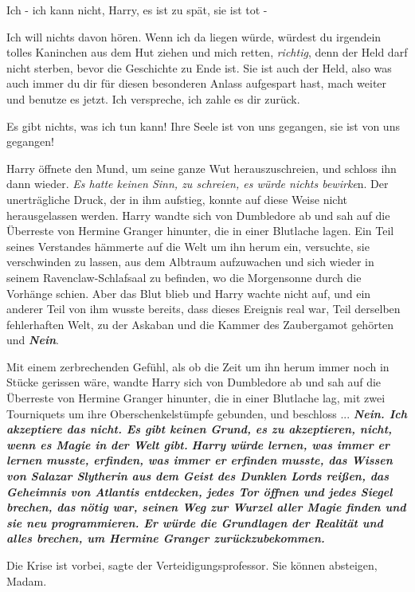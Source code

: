 \glqq{}Ich - ich kann nicht, Harry, es ist zu spät, sie ist tot -\grqq{}

\glqq{}Ich will nichts davon hören. Wenn ich da liegen würde, würdest du
irgendein tolles Kaninchen aus dem Hut ziehen und mich retten, \emph{richtig},
denn der Held darf nicht sterben, bevor die Geschichte zu Ende ist. Sie ist auch
der Held, also was auch immer du dir für diesen besonderen Anlass aufgespart
hast, mach weiter und benutze es jetzt. Ich verspreche, ich zahle es dir
zurück.\grqq{}

\glqq{}Es gibt nichts, was ich tun kann! Ihre Seele ist von uns gegangen, sie ist
von uns gegangen!\grqq{}

Harry öffnete den Mund, um seine ganze Wut herauszuschreien, und schloss ihn
dann wieder. \emph{Es hatte keinen Sinn, zu schreien, es würde nichts bewirke}n.
Der unerträgliche Druck, der in ihm aufstieg, konnte auf diese Weise nicht
herausgelassen werden. Harry wandte sich von Dumbledore ab und sah auf die
Überreste von Hermine Granger hinunter, die in einer Blutlache lagen. Ein Teil
seines Verstandes hämmerte auf die Welt um ihn herum ein, versuchte, sie
verschwinden zu lassen, aus dem Albtraum aufzuwachen und sich wieder in seinem
Ravenclaw-Schlafsaal zu befinden, wo die Morgensonne durch die Vorhänge schien.
Aber das Blut blieb und Harry wachte nicht auf, und ein anderer Teil von ihm
wusste bereits, dass dieses Ereignis real war, Teil derselben fehlerhaften Welt,
zu der Askaban und die Kammer des Zaubergamot gehörten und \textbf{\emph{Nein}}.

Mit einem zerbrechenden Gefühl, als ob die Zeit um ihn herum immer noch in
Stücke gerissen wäre, wandte Harry sich von Dumbledore ab und sah auf die
Überreste von Hermine Granger hinunter, die in einer Blutlache lag, mit zwei
Tourniquets um ihre Oberschenkelstümpfe gebunden, und beschloss ...
\textbf{}
\textbf{\emph{Nein. Ich akzeptiere das nicht. Es gibt keinen Grund, es zu
akzeptieren, nicht, wenn es Magie in der Welt gibt.}} \textbf{}
\textbf{\emph{Harry würde lernen, was immer er lernen musste, erfinden, was
immer er erfinden musste, das Wissen von Salazar Slytherin aus dem Geist des
Dunklen Lords reißen, das Geheimnis von Atlantis entdecken, jedes Tor öffnen und
jedes Siegel brechen, das nötig war, seinen Weg zur Wurzel aller Magie finden
und sie neu programmieren. Er würde die Grundlagen der Realität und alles
brechen, um Hermine Granger zurückzubekommen.}}

\glqq{}Die Krise ist vorbei\grqq{}, sagte der Verteidigungsprofessor. \glqq{}Sie
können absteigen, Madam.\grqq{}

